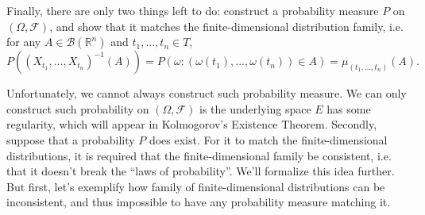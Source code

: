 Finally, there are only two things left to do: construct a probability measure $P$
on $(\Omega, \mathcal F)$, and show that it matches the finite-dimensional
distribution family, i.e.
for any $A \in \mathcal B(\mathbb R^n)$ and $t_1,...,t_n \in T$,
\begin{displaymath}
	P((X_{t_1},...,X_{t_n})^{-1}(A)) = P(\omega : (\omega(t_1),...,\omega(t_n)) \in A) = \mu_{(t_1,...,t_n)}(A).
\end{displaymath}

Unfortunately, we cannot always construct such probability measure.
We can only construct such probability on $(\Omega,\mathcal F)$ is the
underlying space $E$ has some regularity, which will appear in Kolmogorov's Existence Theorem.
Secondly, suppose that a probability $P$ does exist. For it to
match the finite-dimensional distributions, it is required that the finite-dimensional
family be consistent, i.e. that it doesn't break the ``laws of probability''. We'll formalize
this idea further. But first, let's exemplify how family of finite-dimensional distributions
can be inconsistent, and thus impossible to have any probability measure matching it.

